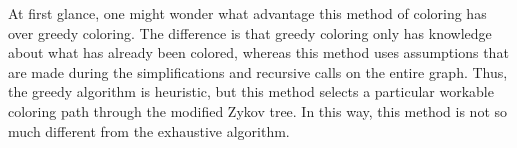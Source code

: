 \begin{enumerate}
\end{enumerate}

At first glance, one might wonder what advantage this method of coloring has over greedy coloring.  The difference
is that greedy coloring only has knowledge about what has already been colored, whereas this method uses
assumptions that are made during the simplifications and recursive calls on the entire graph.  Thus, the greedy
algorithm is heuristic, but this method selects a particular workable coloring path through the modified Zykov
tree.  In this way, this method is not so much different from the exhaustive algorithm.

